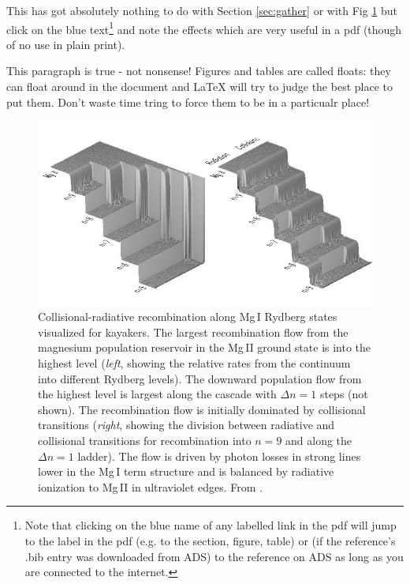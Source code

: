 \documentclass[twoside,fontsize=12pt,
     bibliography=totoc, %
     listof=totoc, %
     index=totoc, %
     onehalfspacing %
]{_MScDiss2017_cls}
\begin{document}
This has got absolutely nothing to do with Section \ref{sec:gather} or with Fig \ref{fig:waterfalls} but click on the blue text\footnote{Note that clicking on the blue name of any labelled link in the pdf will jump to the label in the pdf (e.g. to the section, figure, table) or (if the reference's .bib entry was downloaded from ADS) to the reference on ADS as long as you are connected to the internet.}
and note the effects which are very useful in a pdf (though of no use in plain print). 

This paragraph is true - not nonsense! Figures and tables are called floats: they can float around in the document and LaTeX will try to judge the best place to put them. Don't waste time tring to force them to be in a particualr place!

\begin{figure}[hbtp]
\begin{center}
  \includegraphics[width=155mm]{fig_waterfalls}  %
  \caption[ Collisional-radiative recombination along Mg\,I Rydberg states ]%
 { Collisional-radiative recombination along Mg\,I Rydberg states
    visualized for kayakers.  The largest recombination flow from the
    magnesium population reservoir in the Mg\,II ground state is into
    the highest level ({\em left\/}, showing the relative rates from
    the continuum into different Rydberg levels).  The downward
    population flow from the highest level is largest along the
    cascade with $\Delta n \!=\!1$ steps (not shown).  
    The recombination flow is initially dominated by collisional
    transitions ({\em right\/}, showing the division between radiative
    and collisional transitions for recombination into $n\!=\!9$ and
    along the $\Delta n \!=\!1$ ladder).  The flow is driven by photon
    losses in strong lines lower in the Mg\,I term structure and is
    balanced by radiative ionization to Mg\,II in ultraviolet edges.
    From . 
    } %
\label{fig:waterfalls}
\end{center}
\end{figure}   
\end{document}
